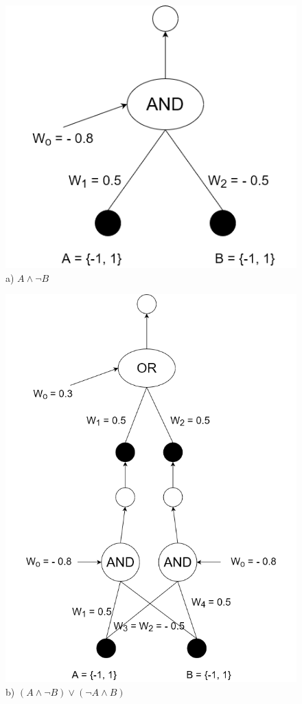 \documentclass[12pt]{article}
\begin{document}
	\begin{figure}[H]
		\centering
		\includegraphics[width=150mm]{Untitled1.png} 
		\caption{a) $A \land \lnot B$}
	\end{figure}
	
	\begin{figure}[H]
		\centering
		\includegraphics[width=140mm]{Untitled2.png} 
		\caption{b) $(A \land \lnot B) \lor (\lnot A \land B)$}
	\end{figure}
	
\end{document}
